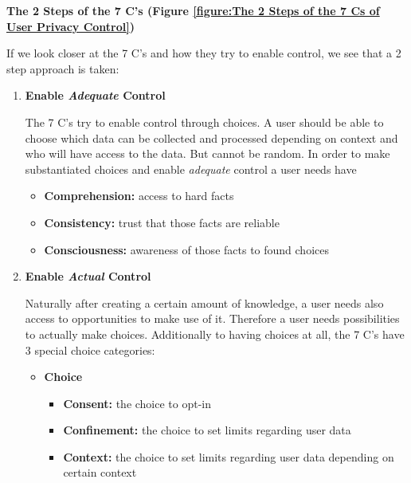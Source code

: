 \textbf{The 2 Steps of the 7 C's (Figure \ref{figure:The 2 Steps of the 7 Cs of User Privacy Control})}

If we look closer at the 7 C's and how they try to enable control, we
see that a 2 step approach is taken:



\begin{enumerate}

\item
\textbf{Enable \emph{Adequate} Control}

The 7 C's try to enable control through choices. A user should be able
to choose which data can be collected and processed depending on context
and who will have access to the data. But cannot be random. In order to
make substantiated choices and enable \emph{adequate} control a user
needs have

\begin{itemize}

\item
  \textbf{Comprehension:} access to hard facts
\item
  \textbf{Consistency:} trust that those facts are reliable
\item
  \textbf{Consciousness:} awareness of those facts to found choices
\end{itemize}

\item
\textbf{Enable \emph{Actual} Control}

Naturally after creating a certain amount of knowledge, a user needs
also access to opportunities to make use of it. Therefore a user needs
possibilities to actually make choices. Additionally to having choices at
all, the 7 C's have 3 special choice categories:

\begin{itemize}

\item
  \textbf{Choice}
  \begin{itemize}
  \item
    \textbf{Consent:} the choice to opt-in
  \item
    \textbf{Confinement:} the choice to set limits regarding user data
  \item
    \textbf{Context:} the choice to set limits regarding user data
    depending on certain context
  \end{itemize}

\end{itemize}


\end{enumerate}
